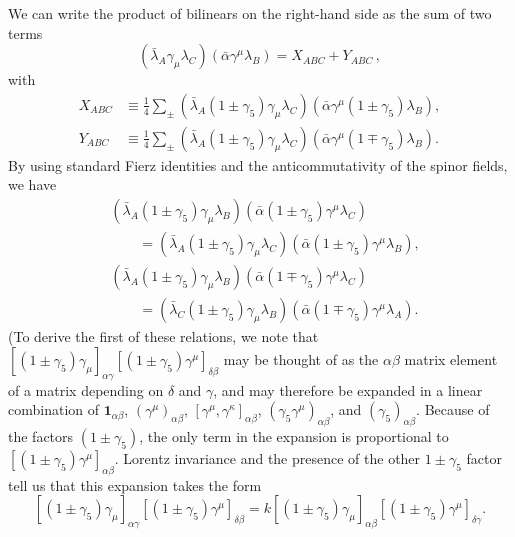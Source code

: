 We can write the product of bilinears on the right-hand side as the sum
of two terms
\[
  \left(\bar\lambda_A\gamma_\mu\lambda_C\right)
  \left(\bar\alpha\gamma^\mu\lambda_B\right)
  =X_{ABC}+Y_{ABC}\,,
\]
with
\[
  \begin{aligned}
  X_{ABC}
  &\equiv\frac14\sum_{\pm}
    \left(\bar\lambda_A(1\mathbin{\pm}\gamma_5)\gamma_\mu\lambda_C\right)
    \left(\bar\alpha\gamma^\mu(1\mathbin{\pm}\gamma_5)\lambda_B\right),
  \\
  Y_{ABC}
  &\equiv\frac14\sum_{\pm}
    \left(\bar\lambda_A(1\mathbin{\pm}\gamma_5)\gamma_\mu\lambda_C\right)
    \left(\bar\alpha\gamma^\mu(1\mathbin{\mp}\gamma_5)\lambda_B\right).
  \end{aligned}
\]
By using standard Fierz identities and the anticommutativity of the spinor
fields, we have
\[
  \begin{aligned}
  &\left(\bar\lambda_A(1\mathbin{\pm}\gamma_5)\gamma_\mu\lambda_B\right)
   \left(\bar\alpha(1\mathbin{\pm}\gamma_5)\gamma^\mu\lambda_C\right)
  \\
  &\qquad=
   \left(\bar\lambda_A(1\mathbin{\pm}\gamma_5)\gamma_\mu\lambda_C\right)
   \left(\bar\alpha(1\mathbin{\pm}\gamma_5)\gamma^\mu\lambda_B\right),
  \\
  &\left(\bar\lambda_A(1\mathbin{\pm}\gamma_5)\gamma_\mu\lambda_B\right)
   \left(\bar\alpha(1\mathbin{\mp}\gamma_5)\gamma^\mu\lambda_C\right)
  \\
  &\qquad=
   \left(\bar\lambda_C(1\mathbin{\pm}\gamma_5)\gamma_\mu\lambda_B\right)
   \left(\bar\alpha(1\mathbin{\mp}\gamma_5)\gamma^\mu\lambda_A\right).
  \end{aligned}
\]
(To derive the first of these relations, we note that
\([(1\mathbin{\pm}\gamma_5)\gamma_\mu]_{\alpha\gamma}
 [(1\mathbin{\pm}\gamma_5)\gamma^\mu]_{\delta\beta}\)
may be thought of as the \(\alpha\beta\) matrix element of a matrix
depending on \(\delta\) and \(\gamma\), and may therefore be expanded in a
linear combination of \(\mathbf{1}_{\alpha\beta}\),
\((\gamma^\mu)_{\alpha\beta}\),
\([\gamma^\mu,\gamma^\kappa]_{\alpha\beta}\),
\((\gamma_5\gamma^\mu)_{\alpha\beta}\), and
\((\gamma_5)_{\alpha\beta}\). Because of the factors
\((1\mathbin{\pm}\gamma_5)\), the only term in the expansion is
proportional to
\([(1\mathbin{\pm}\gamma_5)\gamma^\mu]_{\alpha\beta}\). Lorentz invariance
and the presence of the other \(1\mathbin{\pm}\gamma_5\) factor tell us
that this expansion takes the form
\[
  [(1\mathbin{\pm}\gamma_5)\gamma_\mu]_{\alpha\gamma}
  [(1\mathbin{\pm}\gamma_5)\gamma^\mu]_{\delta\beta}
  =k[(1\mathbin{\pm}\gamma_5)\gamma_\mu]_{\alpha\beta}
    [(1\mathbin{\pm}\gamma_5)\gamma^\mu]_{\delta\gamma}.
\]
